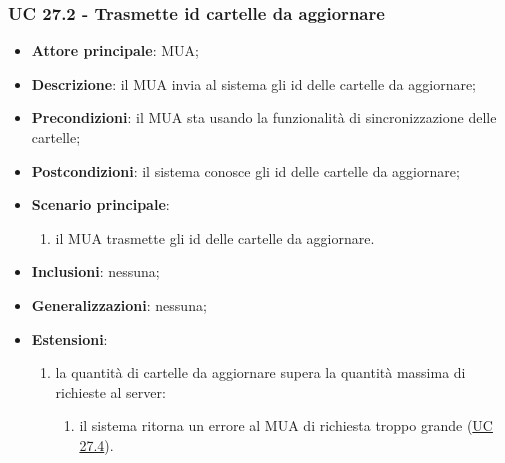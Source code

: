     \subsubsection{UC 27.2 - Trasmette id cartelle da aggiornare} \label{sec:UC27.2}
    \begin{itemize}
        \item \textbf{Attore principale}: MUA;
        \item \textbf{Descrizione}: il MUA invia al sistema gli id delle cartelle da aggiornare;
        \item \textbf{Precondizioni}: il MUA sta usando la funzionalità di sincronizzazione delle cartelle;
        \item \textbf{Postcondizioni}: il sistema conosce gli id delle cartelle da aggiornare;
        \item \textbf{Scenario principale}:
            \begin{enumerate}
                \item il MUA trasmette gli id delle cartelle da aggiornare.
            \end{enumerate}
        \item \textbf{Inclusioni}: nessuna;
        \item \textbf{Generalizzazioni}: nessuna;
        \item \textbf{Estensioni}:
            \begin{enumerate}[label=\alph*.]
                \item la quantità di cartelle da aggiornare supera la quantità massima di richieste al server:
                \begin{enumerate}[label=\arabic*.]
                    \item il sistema ritorna un errore al MUA di richiesta troppo grande (\hyperref[sec:UC27.4]{UC 27.4}).
                \end{enumerate}
            \end{enumerate}
    \end{itemize}


